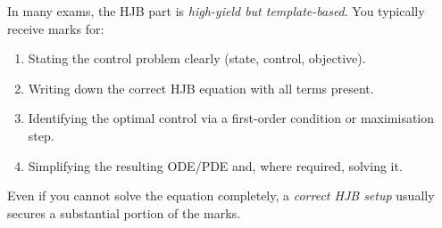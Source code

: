\documentclass[12pt]{article}
\begin{document}
\begin{examtip}
In many exams, the HJB part is \emph{high-yield but template-based}. You typically
receive marks for:
\begin{enumerate}[noitemsep]
  \item Stating the control problem clearly (state, control, objective).
  \item Writing down the correct HJB equation with all terms present.
  \item Identifying the optimal control via a first-order condition or maximisation step.
  \item Simplifying the resulting ODE/PDE and, where required, solving it.
\end{enumerate}
Even if you cannot solve the equation completely, a \emph{correct HJB setup}
usually secures a substantial portion of the marks.
\end{examtip}



\begingroup
{}
\fontsize{10pt}{11pt}\selectfont
\end{document}
